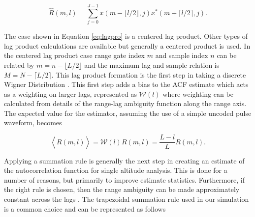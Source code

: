 \begin{equation}
\label{eq:lagpro}
\widehat{R}(m,l) = \displaystyle\sum\limits_{j=0}^{J-1} x(m-\lfloor l/2\rfloor,j)x^*(m+\lceil l/2 \rceil,j).
\end{equation}

The case shown in Equation \ref{eq:lagpro} is a centered lag product.  Other types of lag product calculations are available but generally a centered product is used. In the centered lag product case range gate index $m$ and sample index $n$ can be related by $m=n-\lfloor L/2\rfloor$ and the maximum lag and sample relation is $M=N-\lceil L/2 \rceil$.  This lag product formation is the first step in taking a discrete Wigner Distribution \cite{TFAcohen}. This first step adds a bias to the ACF estimate which acts as a weighting on larger lags, represented as $\mathcal{W}(l)$ where weighting can be calculated from details of the range-lag ambiguity function along the range axis. The expected value for the estimator, assuming the use of a simple uncoded pulse waveform, becomes

\begin{equation}
\label{eq:lagprobias}
\left\langle\widehat{R}(m,l) \right\rangle = \mathcal{W}(l)R(m,l) =\frac{L-l}{L}R(m,l).
\end{equation}
%
%

Applying a summation rule is generally the next step in creating an estimate of the autocorrelation function for single altitude analysis. This is done for a number of reasons, but primarily to improve estimate statistics.  Furthermore, if the right rule is chosen, then the range ambiguity can be made approximately constant across the lags \cite{nygren1996}. The trapezoidal summation rule used in our simulation is a common choice and can be represented as follows

